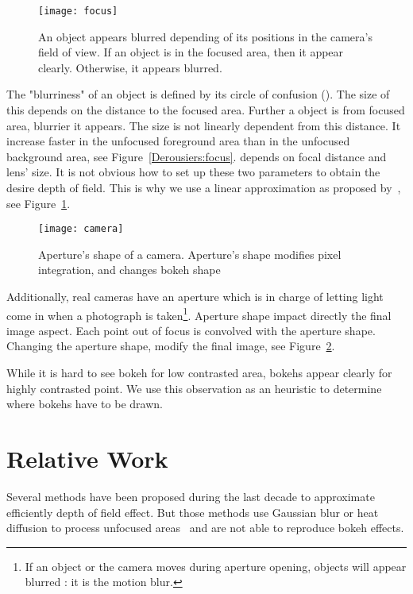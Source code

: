 	\begin{figure}[htb]\centering
	\texttt{[image: focus]}
	\caption{An object appears blurred depending of its positions in the camera's field of view. 
If an object is in the focused area, then it appear clearly. Otherwise, it appears blurred. }
	\label{DeRousiers:focus}
	\end{figure}


The "blurriness" of an object is defined by its circle of confusion (\coc). The size of this \coc depends on the distance to the focused area. Further a object is from focused area, blurrier it appears. The \coc size is not linearly dependent from this distance. It increase faster in the unfocused foreground area than in the unfocused background area, see Figure~\ref{Derousiers:focus}. \coc depends on focal distance and lens' size. It is not obvious how to set up these two parameters to obtain the desire depth of field. This is why we use a linear approximation as proposed by~\cite{Hammon07}, see Figure~\ref{DeRousiers:focus}.

	\begin{figure}[htb]\centering
	\texttt{[image: camera]}
	\caption{Aperture's shape of a camera. Aperture's shape modifies pixel integration, and changes bokeh shape }
	\label{DeRousiers:camera}
	\end{figure}

Additionally, real cameras have an aperture which is in charge of letting light come in when a photograph is taken\footnote{If an object or the camera moves during aperture opening, objects will appear blurred : it is the motion blur.}. Aperture shape impact directly the final image aspect. Each point out of focus is convolved with the aperture shape. Changing the aperture shape, modify the final image, see Figure~\ref{DeRousiers:camera}.

While it is hard to see bokeh for low contrasted area, bokehs appear clearly for highly contrasted point. We use this observation as an heuristic to determine where bokehs have to be drawn.

\section{Relative Work}\label{Derousiers:RelativeWork}

Several methods have been proposed during the last decade to approximate efficiently depth of field effect. But those methods use Gaussian blur or heat diffusion to process unfocused areas~\cite{Kosloff07,Hammon07} and are not able to reproduce bokeh effects.

